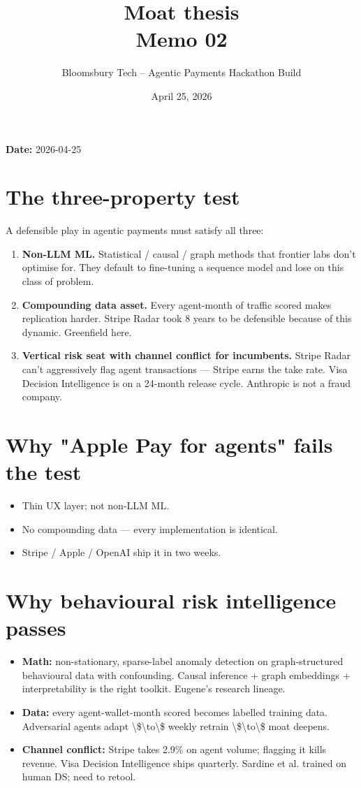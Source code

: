 \documentclass[11pt]{article}
\title{\textbf{Moat thesis}\\
\large Memo 02}
\author{Bloomsbury Tech -- Agentic Payments Hackathon Build}
\date{April 25, 2026}
\begin{document}
\maketitle

\textbf{Date:} 2026-04-25

\section{The three-property test}
A defensible play in agentic payments must satisfy all three:

\begin{enumerate}
  \item \textbf{Non-LLM ML.} Statistical / causal / graph methods that frontier labs don't optimise for. They default to fine-tuning a sequence model and lose on this class of problem.
  \item \textbf{Compounding data asset.} Every agent-month of traffic scored makes replication harder. Stripe Radar took 8 years to be defensible because of this dynamic. Greenfield here.
  \item \textbf{Vertical risk seat with channel conflict for incumbents.} Stripe Radar can't aggressively flag agent transactions --- Stripe earns the take rate. Visa Decision Intelligence is on a 24-month release cycle. Anthropic is not a fraud company.
\end{enumerate}
\section{Why "Apple Pay for agents" fails the test}
\begin{itemize}
  \item Thin UX layer; not non-LLM ML.
  \item No compounding data --- every implementation is identical.
  \item Stripe / Apple / OpenAI ship it in two weeks.
\end{itemize}
\section{Why behavioural risk intelligence passes}
\begin{itemize}
  \item \textbf{Math:} non-stationary, sparse-label anomaly detection on graph-structured behavioural data with confounding. Causal inference + graph embeddings + interpretability is the right toolkit. Eugene's research lineage.
  \item \textbf{Data:} every agent-wallet-month scored becomes labelled training data. Adversarial agents adapt \textbackslash{}\$\textbackslash{}to\textbackslash{}\$ weekly retrain \textbackslash{}\$\textbackslash{}to\textbackslash{}\$ moat deepens.
  \item \textbf{Channel conflict:} Stripe takes 2.9\% on agent volume; flagging it kills revenue. Visa Decision Intelligence ships quarterly. Sardine et al. trained on human DS; need to retool.
\end{itemize}
\end{document}
